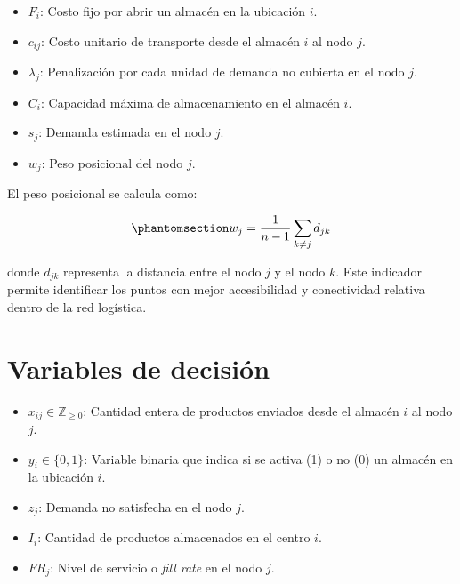 \documentclass[
  spanish,
  us-letterpaper,
]{scrreprt}
\providecommand{\tightlist}{%
  \setlength{\itemsep}{0pt}\setlength{\parskip}{0pt}}
\numberwithin{equation}{section}
\begin{document}
\begin{itemize}
\tightlist
\item
  \(F_i\): Costo fijo por abrir un almacén en la ubicación \(i\).\\
\item
  \(c_{ij}\): Costo unitario de transporte desde el almacén \(i\) al
  nodo \(j\).\\
\item
  \(\lambda_j\): Penalización por cada unidad de demanda no cubierta en
  el nodo \(j\).\\
\item
  \(C_i\): Capacidad máxima de almacenamiento en el almacén \(i\).\\
\item
  \(s_j\): Demanda estimada en el nodo \(j\).\\
\item
  \(w_j\): Peso posicional del nodo \(j\).
\end{itemize}

El peso posicional se calcula como:

\begin{equation}\phantomsection\label{eq-PBHE_completa}{
w_j = \frac{1}{n-1} \sum_{k \neq j} d_{jk} 
}\end{equation}

donde \(d_{jk}\) representa la distancia entre el nodo \(j\) y el nodo
\(k\). Este indicador permite identificar los puntos con mejor
accesibilidad y conectividad relativa dentro de la red logística.

\section{Variables de decisión}\label{variables-de-decisiuxf3n}

\begin{itemize}
\tightlist
\item
  \(x_{ij} \in \mathbb{Z}_{\geq 0}\): Cantidad entera de productos
  enviados desde el almacén \(i\) al nodo \(j\).\\
\item
  \(y_i \in \{0,1\}\): Variable binaria que indica si se activa (1) o no
  (0) un almacén en la ubicación \(i\).\\
\item
  \(z_j\): Demanda no satisfecha en el nodo \(j\).\\
\item
  \(I_i\): Cantidad de productos almacenados en el centro \(i\).\\
\item
  \(FR_j\): Nivel de servicio o \emph{fill rate} en el nodo \(j\).
\end{itemize}
\end{document}
